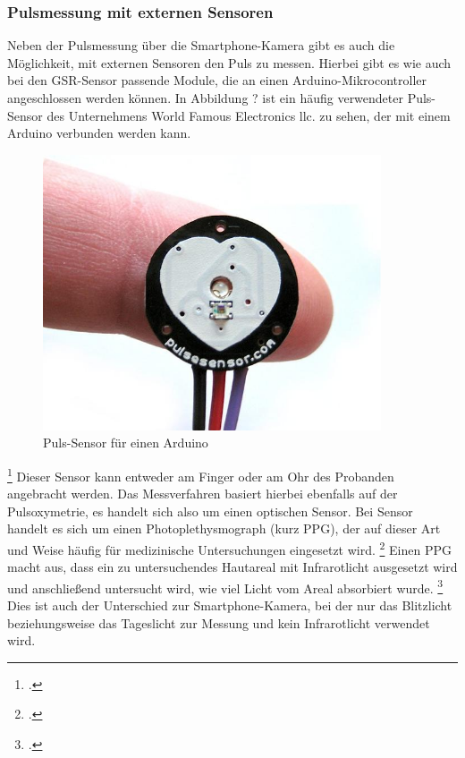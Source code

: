 {\subsubsection{Pulsmessung mit externen Sensoren}
Neben der Pulsmessung über die Smartphone-Kamera gibt es auch die Möglichkeit, mit externen Sensoren den Puls zu messen. Hierbei gibt es wie auch bei den GSR-Sensor passende Module, die an einen Arduino-Mikrocontroller angeschlossen werden können. \newline
In Abbildung ? ist ein häufig verwendeter Puls-Sensor des Unternehmens World Famous Electronics llc. zu sehen, der mit einem Arduino verbunden werden kann. \newline
\begin{figure}[h]
	\centering
	\includegraphics[width=10cm]{Bilder/pulsesensor.jpg}
	\caption[Puls-Sensor für einen Arduino]{Puls-Sensor für einen Arduino\footnotemark}
\end{figure}\footcitetext{Wor18a} \newline
Dieser Sensor kann entweder am Finger oder am Ohr des Probanden angebracht werden. Das Messverfahren basiert hierbei ebenfalls auf der Pulsoxymetrie, es handelt sich also um einen optischen Sensor. Bei Sensor handelt es sich um einen Photoplethysmograph (kurz PPG), der auf dieser Art und Weise häufig für medizinische Untersuchungen eingesetzt wird. \footcite[Vgl. ][]{Wor18b}
Einen PPG macht aus, dass ein zu untersuchendes Hautareal mit Infrarotlicht ausgesetzt wird und anschließend untersucht wird, wie viel Licht vom Areal absorbiert wurde. \footcite[Vgl. ][S. 38]{Rab06}
Dies ist auch der Unterschied zur Smartphone-Kamera, bei der nur das Blitzlicht beziehungsweise das Tageslicht zur Messung und kein Infrarotlicht verwendet wird.
}
